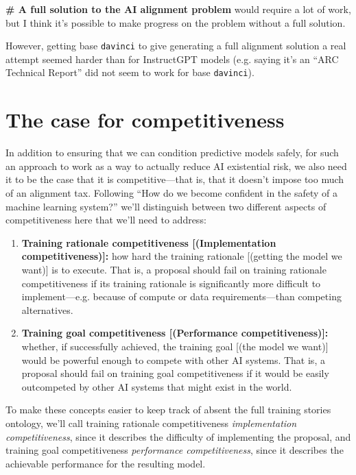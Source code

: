\documentclass[
  twocolumn,
  natbib,
]{miri-tech-article}
\newenvironment{modelquote}%
  {\list{}{\leftmargin=0.3in\rightmargin=0.3in}\item[]}%
  {\endlist}
\begin{document}
\begin{modelquote}
\textbf{\# A full solution to the AI alignment problem} would require a lot of work, but I think it's possible to make progress on the problem without a full solution.
\end{modelquote}

     However, getting base \texttt{davinci} to give generating a full alignment solution a real attempt seemed harder than for InstructGPT models (e.g. saying it's an ``ARC Technical Report'' did not seem to work for base \texttt{davinci}).




\section{The case for competitiveness}
\label{sec:3}

In addition to ensuring that we can condition predictive models safely, for such an approach to work as a way to actually reduce AI existential risk, we also need it to be the case that it is competitive---that is, that it doesn't impose too much of an alignment tax\cite{paul_christiano_current_work}. Following ``How do we become confident in the safety of a machine learning system?\cite{how_become_confident}'' we'll distinguish between two different aspects of competitiveness here that we'll need to address:

\begin{enumerate}
\item \textbf{Training rationale competitiveness [(Implementation competitiveness)]:} how hard the training rationale [(getting the model we want)] is to execute. That is, a proposal should fail on training rationale competitiveness if its training rationale is significantly more difficult to implement---e.g. because of compute or data requirements---than competing alternatives.
\item \textbf{Training goal competitiveness [(Performance competitiveness)]:} whether, if successfully achieved, the training goal [(the model we want)] would be powerful enough to compete with other AI systems. That is, a proposal should fail on training goal competitiveness if it would be easily outcompeted by other AI systems that might exist in the world.
\end{enumerate}

To make these concepts easier to keep track of absent the full training stories ontology\cite{how_become_confident}, we'll call training rationale competitiveness \textit{implementation competitiveness}, since it describes the difficulty of implementing the proposal, and training goal competitiveness \textit{performance competitiveness}, since it describes the achievable performance for the resulting model.
\end{document}
